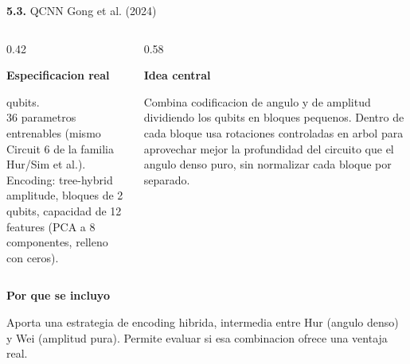 \documentclass[aspectratio=169]{beamer}
\newcommand{\bmheading}[2]{\textbf{\color{#1}#2}\par\smallskip}
\newcommand{\subsec}[2]{\textbf{\color{bmIndigo}#1.} #2}
\begin{document}
\begin{frame}{\subsec{5.3}{QCNN Gong et al. (2024)}}
  \footnotesize
  \begin{columns}[T]
    \begin{column}{0.42\textwidth}
      \begin{bluebox}
        \bmheading{bmBlue}{Especificacion real}
        8 qubits.\\
        36 parametros entrenables (mismo Circuit 6 de la familia Hur/Sim et
        al.).\\
        Encoding: tree-hybrid amplitude, bloques de 2 qubits, capacidad de 12
        features (PCA a 8 componentes, relleno con ceros).
      \end{bluebox}
    \end{column}
    \begin{column}{0.58\textwidth}
      \begin{indigobox}
        \bmheading{bmIndigo}{Idea central}
        Combina codificacion de angulo y de amplitud dividiendo los qubits en
        bloques pequenos. Dentro de cada bloque usa rotaciones controladas en
        arbol para aprovechar mejor la profundidad del circuito que el angulo
        denso puro, sin normalizar cada bloque por separado.
      \end{indigobox}
    \end{column}
  \end{columns}
  \vspace{8pt}
  \begin{amberbox}
    \bmheading{bmAmber}{Por que se incluyo}
    Aporta una estrategia de encoding hibrida, intermedia entre Hur (angulo
    denso) y Wei (amplitud pura). Permite evaluar si esa combinacion ofrece
    una ventaja real.
  \end{amberbox}
\end{frame}
\end{document}
